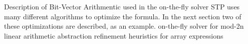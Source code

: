 Description of Bit-Vector Arithmentic used in the on-the-fly solver\cite{10.1007/978-3-540-71209-1_28}
STP uses many different algorithms to optimize the formula. In the next section two of these optimizations are described, as an example.
on-the-fly solver for mod-2n linear arithmetic
abstraction refinement heuristics for array expressions 